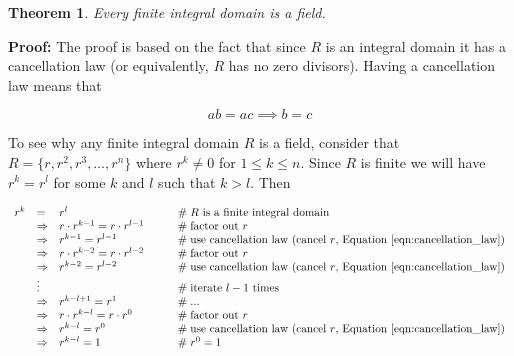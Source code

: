 \documentclass[11pt, oneside]{article}   	%
\newtheorem{thm}{Theorem}[section]
\theoremstyle{definition}
\begin{document}
\bigskip
\begin{thm}
Every finite integral domain is a field.
\label{thm:finite_id_is_a_field}
\end{thm}

\noindent
\textbf{Proof:}  The proof is based on the fact that since $R$ is an integral domain it has a cancellation law (or equivalently, $R$ has no zero divisors). 
Having a cancellation law means that

\begin{equation}
ab = ac \implies b = c
\label{eqn:cancellation_law}
\end{equation}


\bigskip
\noindent
To see why any finite integral domain $R$ is a field, consider that $R = \{r, r^2, r^3, \hdots, r^n\}$  where 
$r^k \neq 0$ for $1 \leq k \leq n$.  Since $R$ is finite we will have $r^k = r^l$ for some $k$ and $l$ such that $k > l$. Then

\bigskip
\begin{equation*}
\begin{array}{rlll} 
r^k 
&=& r^l                                                                                        &    \qquad \mathrel{\#} \text{$R$ is a finite integral domain}        \\
&\Rightarrow& r \cdot r^{k-1} = r \cdot r^{l -1}                             &    \qquad \mathrel{\#} \text{factor out $r$}                                  \\
&\Rightarrow& r^{k-1} = r^{l -1}                                                   &    \qquad\mathrel{\#} \text{use cancellation law (cancel $r$, Equation \ref{eqn:cancellation_law}})    \\
&\Rightarrow& r \cdot r^{k-2} = r \cdot r^{l -2}                             &    \qquad\mathrel{\#} \text{factor out $r$}                                   \\
&\Rightarrow& r^{k-2} = r^{l -2}                                                   &    \qquad\mathrel{\#} \text{use cancellation law (cancel $r$, Equation \ref{eqn:cancellation_law})}  \\
&\vdots                                                                                        && \qquad\mathrel{\#} \text{iterate $l - 1$ times}                          \\    
&\Rightarrow& r^{k - l + 1} = r^1                                                 &     \qquad\mathrel{\#} \text{...}                                                    \\       
&\Rightarrow& r \cdot r^{k - l} = r \cdot r^0                                 &     \qquad\mathrel{\#} \text{factor out $r$}                                   \\    
&\Rightarrow& r^{k-l} = r^{0}                                                       &    \qquad\mathrel{\#} \text{use cancellation law (cancel $r$, Equation \ref{eqn:cancellation_law})}   \\   
&\Rightarrow& r^{k-l} = 1                                                            &     \qquad\mathrel{\#} r^0 = 1
\end{array}
\end{equation*}
\end{document}
